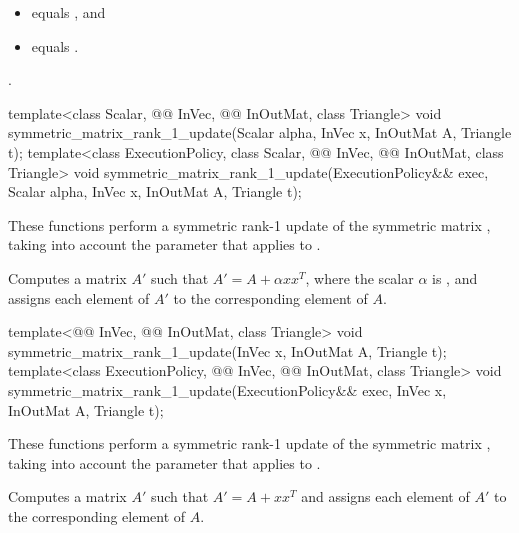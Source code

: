 \pnum
\expects
\begin{itemize}
\item
{} equals , and
\item
{} equals .
\end{itemize}

\pnum
\complexity
{}.

%
\begin{itemdecl}
template<class Scalar, @@ InVec, @@ InOutMat, class Triangle>
  void symmetric_matrix_rank_1_update(Scalar alpha, InVec x, InOutMat A, Triangle t);
template<class ExecutionPolicy,
         class Scalar, @@ InVec, @@ InOutMat, class Triangle>
  void symmetric_matrix_rank_1_update(ExecutionPolicy&& exec,
                                      Scalar alpha, InVec x, InOutMat A, Triangle t);
\end{itemdecl}

\begin{itemdescr}
\pnum
These functions perform
a symmetric rank-1 update of the symmetric matrix ,
taking into account the  parameter
that applies to .

\pnum
\effects
Computes a matrix $A'$ such that
$A' = A + \alpha x x^T$, where the scalar $\alpha$ is ,
and assigns each element of $A'$ to the corresponding element of $A$.
\end{itemdescr}

%
\begin{itemdecl}
template<@@ InVec, @@ InOutMat, class Triangle>
  void symmetric_matrix_rank_1_update(InVec x, InOutMat A, Triangle t);
template<class ExecutionPolicy,
         @@ InVec, @@ InOutMat, class Triangle>
  void symmetric_matrix_rank_1_update(ExecutionPolicy&& exec, InVec x, InOutMat A, Triangle t);
\end{itemdecl}

\begin{itemdescr}
\pnum
These functions perform
a symmetric rank-1 update of the symmetric matrix ,
taking into account the  parameter
that applies to .

\pnum
\effects
Computes a matrix $A'$ such that $A' = A + x x^T$
and assigns each element of $A'$ to the corresponding element of $A$.
\end{itemdescr}

